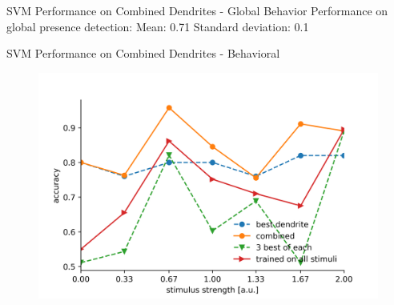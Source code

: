 \documentclass[10pt]{beamer}
\begin{document}
\begin{frame}[fragile]{SVM Performance on Combined Dendrites - Global Behavior}
Performance on global presence detection: \newline
Mean: 0.71 \newline
Standard deviation: 0.1
\end{frame}

\begin{frame}[fragile]{SVM Performance on Combined Dendrites - Behavioral}
\begin{center}
	\begin{figure}
      \includegraphics[width=1.0\textwidth]{combined_hitmiss_alt.png}
	\end{figure}
	\end{center}
\end{frame}
\end{document}
